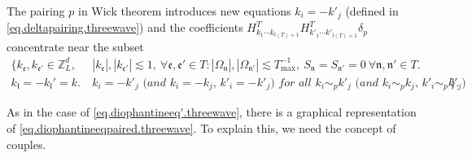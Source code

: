 The pairing $p$ in Wick theorem introduces new equations $k_{i}=-k'_{j}$ (defined in \eqref{eq.deltapairing.threewave}) and the coefficients $H^T_{k_1\cdots k_{l(T)+1}} H^{T}_{k'_1\cdots k'_{l(T)+1}} \delta_{p}$ concentrate near the subset 
\begin{equation}\label{eq.diophantineeqpaired.threewave}
\begin{split}
    \{k_{\mathfrak{e}}, k_{\mathfrak{e}'}\in \mathbb{Z}^d_L,\ &|k_{\mathfrak{e}}|, |k_{\mathfrak{e}'}|\lesssim 1,\ \forall \mathfrak{e},\mathfrak{e}'\in T: |\Omega_{\mathfrak{n}}|,|\Omega_{\mathfrak{n}'}|\lesssim T^{-1}_{\text{max}},\ S_{\mathfrak{n}}=S_{\mathfrak{n}'}=0\ \forall \mathfrak{n},\mathfrak{n}'\in T.
    \\
    k_{\mathfrak{l}}=-k_{\mathfrak{l}}'=k.\  
    &\textit{$k_{i}=-k'_{j}$ (and $k_{i}=-k_{j}$, $k'_{i}=-k'_{j}$) for all $k_{i}\sim_{p}k'_{j}$ (and $k_{i}\sim_{p}k_{j}$, $k'_{i}\sim_{p}k'_{j}$)}\}.
\end{split}
\end{equation}

As in the case of \eqref{eq.diophantineeq'.threewave}, there is a graphical representation of \eqref{eq.diophantineeqpaired.threewave}. To explain this, we need the concept of couples.




